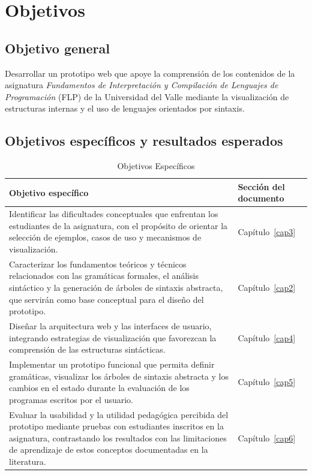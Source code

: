 \section{Objetivos}

\subsection{Objetivo general}
Desarrollar un prototipo web que apoye la comprensión de los contenidos de la asignatura \textit{Fundamentos de Interpretación y Compilación de Lenguajes de Programación} (FLP) de la Universidad del Valle mediante la visualización de estructuras internas y el uso de lenguajes orientados por sintaxis.

\subsection{Objetivos específicos y resultados esperados}
\begin{table}[H]
    \centering
    \begin{tabular}{|p{11cm}|p{5cm}|}
        \hline
        \textbf{Objetivo específico} & \textbf{Sección del documento} \\
        \hline
        Identificar las dificultades conceptuales que enfrentan los estudiantes de la asignatura, con el propósito de orientar la selección de ejemplos, casos de uso y mecanismos de visualización.&Capítulo~\ref{cap3}\\
        \hline
        Caracterizar los fundamentos teóricos y técnicos relacionados con las gramáticas formales, el análisis sintáctico y la generación de árboles de sintaxis abstracta, que servirán como base conceptual para el diseño del prototipo.&Capítulo~\ref{cap2} \\
        \hline
        Diseñar la arquitectura web y las interfaces de usuario, integrando estrategias de visualización que favorezcan la comprensión de las estructuras sintácticas.& Capítulo~\ref{cap4} \\
        \hline
        Implementar un prototipo funcional que permita definir gramáticas, visualizar los árboles de sintaxis abstracta y los cambios en el estado durante la evaluación de los programas escritos por el usuario.&Capítulo~\ref{cap5} \\
        \hline
        Evaluar la usabilidad y la utilidad pedagógica percibida del prototipo mediante pruebas con estudiantes inscritos en la asignatura, contrastando los resultados con las limitaciones de aprendizaje de estos conceptos documentadas en la literatura.&Capítulo~\ref{cap6} \\
        \hline
    \end{tabular}
    \caption{Objetivos Específicos}
    \label{tab:objEspecificos}
\end{table}

